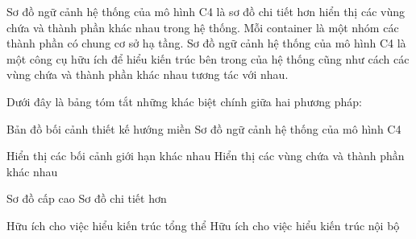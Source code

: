 Sơ đồ ngữ cảnh hệ thống của mô hình C4 là sơ đồ chi tiết hơn hiển thị các vùng chứa và thành phần khác nhau trong hệ thống. Mỗi container là một nhóm các thành phần có chung cơ sở hạ tầng. Sơ đồ ngữ cảnh hệ thống của mô hình C4 là một công cụ hữu ích để hiểu kiến trúc bên trong của hệ thống cũng như cách các vùng chứa và thành phần khác nhau tương tác với nhau.

Dưới đây là bảng tóm tắt những khác biệt chính giữa hai phương pháp:

Bản đồ bối cảnh thiết kế hướng miền 	Sơ đồ ngữ cảnh hệ thống của mô hình C4

Hiển thị các bối cảnh giới hạn khác nhau	Hiển thị các vùng chứa và thành phần khác nhau

Sơ đồ cấp cao	Sơ đồ chi tiết hơn

Hữu ích cho việc hiểu kiến trúc tổng thể	Hữu ích cho việc hiểu kiến trúc nội bộ